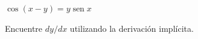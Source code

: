 \item $\cos(x - y) = y \operatorname{sen} x$
\par
Encuentre $dy/dx$ utilizando la derivación implícita.
